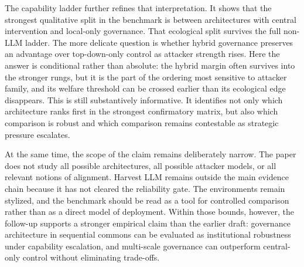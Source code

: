The capability ladder further refines that interpretation. It shows that the strongest qualitative split in the benchmark is between architectures with central intervention and local-only governance. That ecological split survives the full non-LLM ladder. The more delicate question is whether hybrid governance preserves an advantage over top-down-only control as attacker strength rises. Here the answer is conditional rather than absolute: the hybrid margin often survives into the stronger rungs, but it is the part of the ordering most sensitive to attacker family, and its welfare threshold can be crossed earlier than its ecological edge disappears. This is still substantively informative. It identifies not only which architecture ranks first in the strongest confirmatory matrix, but also which comparison is robust and which comparison remains contestable as strategic pressure escalates.

At the same time, the scope of the claim remains deliberately narrow. The paper does not study all possible architectures, all possible attacker models, or all relevant notions of alignment. Harvest LLM remains outside the main evidence chain because it has not cleared the reliability gate. The environments remain stylized, and the benchmark should be read as a tool for controlled comparison rather than as a direct model of deployment. Within those bounds, however, the follow-up supports a stronger empirical claim than the earlier draft: governance architecture in sequential commons can be evaluated as institutional robustness under capability escalation, and multi-scale governance can outperform central-only control without eliminating trade-offs.
